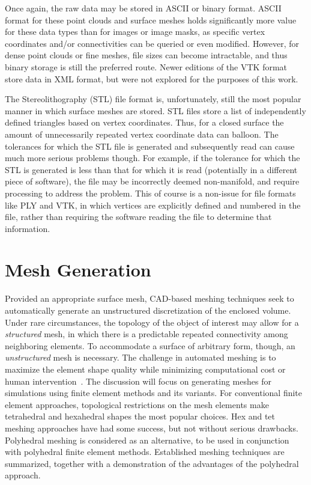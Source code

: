 Once again, the raw data may be stored in ASCII or binary format. ASCII format for these point clouds and surface meshes holds significantly more value for these data types than for images or image masks, as specific vertex coordinates and/or connectivities can be queried or even modified. However, for dense point clouds or fine meshes, file sizes can become intractable, and thus binary storage is still the preferred route. Newer editions of the VTK format store data in XML format, but were not explored for the purposes of this work.

The Stereolithography (STL) file format is, unfortunately, still the most popular manner in which surface meshes are stored. STL files store a list of independently defined triangles based on vertex coordinates. Thus, for a closed surface the amount of unnecessarily repeated vertex coordinate data can balloon. The tolerances for which the STL file is generated and subsequently read can cause much more serious problems though. For example, if the tolerance for which the STL is generated is less than that for which it is read (potentially in a different piece of software), the file may be incorrectly deemed non-manifold, and require processing to address the problem. This of course is a non-issue for file formats like PLY and VTK, in which vertices are explicitly defined and numbered in the file, rather than requiring the software reading the file to determine that information.

\section{Mesh Generation}
%
Provided an appropriate surface mesh, CAD-based meshing techniques seek to automatically generate an unstructured discretization of the enclosed volume. Under rare circumstances, the topology of the object of interest may allow for a \textit{structured} mesh, in which there is a predictable repeated connectivity among neighboring elements. To accommodate a surface of arbitrary form, though, an \textit{unstructured} mesh is necessary. The challenge in automated meshing is to maximize the element shape quality while minimizing computational cost or human intervention~\cite{blacker_2001}. The discussion will focus on generating meshes for simulations using finite element methods and its variants. For conventional finite element approaches, topological restrictions on the mesh elements make tetrahedral and hexahedral shapes the most popular choices. Hex and tet meshing approaches have had some success, but not without serious drawbacks. Polyhedral meshing is considered as an alternative, to be used in conjunction with polyhedral finite element methods. Established meshing techniques are summarized, together with a demonstration of the advantages of the polyhedral approach.

